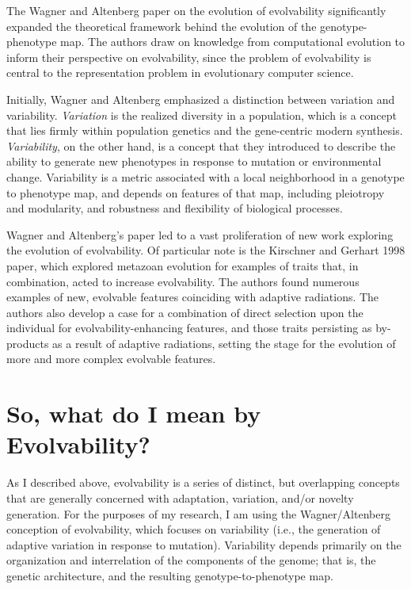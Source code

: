 \documentclass[PhD]{msu-thesis}
\begin{document}
The Wagner and Altenberg paper on the evolution of evolvability significantly expanded the theoretical framework behind the evolution of the genotype-phenotype map\cite{gunter_p._wagner_perspective:_1996}. The authors draw on knowledge from computational evolution to inform their perspective on evolvability, since the problem of evolvability is central to the representation problem in evolutionary computer science. 

Initially, Wagner and Altenberg emphasized a distinction between variation and variability. \textit{Variation} is the realized diversity in a population, which is a concept that lies firmly within population genetics and the gene-centric modern synthesis. \textit{Variability}, on the other hand, is a concept that they introduced to describe the ability to generate new phenotypes in response to mutation or environmental change. Variability is a metric associated with a local neighborhood in a genotype to phenotype map, and depends on features of that map, including pleiotropy and modularity, and robustness and flexibility of biological processes.


Wagner and Altenberg’s paper led to a vast proliferation of new work exploring the evolution of evolvability. Of particular note is the Kirschner and Gerhart 1998 paper\cite{kirschner_evolvability_1998}, which explored metazoan evolution for examples of traits that, in combination, acted to increase evolvability. The authors found numerous examples of new, evolvable features coinciding with adaptive radiations. The authors also develop a case for a combination of direct selection upon the individual for evolvability-enhancing features, and those traits persisting as by-products as a result of adaptive radiations, setting the stage for the evolution of more and more complex evolvable features.




\section{So, what do I mean by Evolvability?}

As I described above, evolvability is a series of distinct, but overlapping concepts that are generally concerned with adaptation, variation, and/or novelty generation. For the purposes of my research, I am using the Wagner/Altenberg conception of evolvability, which focuses on variability (i.e., the generation of adaptive variation in response to mutation). Variability depends primarily on the organization and interrelation of the components of the genome; that is, the genetic architecture, and the resulting genotype-to-phenotype map.
\end{document}
